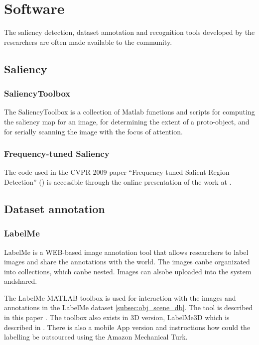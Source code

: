 \section{Software}
\label{sec:soft}

The saliency detection, dataset annotation and recognition tools developed by the researchers are often made available to the community.

\subsection{Saliency}
\subsubsection{SaliencyToolbox}\label{subsec:saltool}
The SaliencyToolbox is a collection of Matlab functions and scripts for computing the saliency map for an image, for determining the extent of a proto-object, and for serially scanning the image with the focus of attention. 

\subsubsection{Frequency-tuned Saliency}
The code used in the CVPR 2009 paper ``Frequency-tuned Salient Region Detection'' (\cite{LCAV-CONF-2009-012}) is accessible through the online presentation of the work at \cite{achantaCVPR09}.

\subsection{Dataset annotation}
\subsubsection{LabelMe}\label{subsec:labelme}
LabelMe is a WEB-based image annotation tool that allows researchers to label images and share the annotations with the world. The images canbe organizated into collections, which canbe nested. Images can alsobe uploaded into the system andshared.

The LabelMe MATLAB toolbox is used for interaction with the images and annotations in the LabelMe dataset \ref{subsec:obj_scene_db}. The tool is described in this paper
\cite{Russell2008}. The toolbox also exists in 3D version, LabelMe3D which is described in \cite{Russell2009}. There is also a mobile App version and instructions how could the labelling be outsourced using the Amazon Mechanical Turk.

